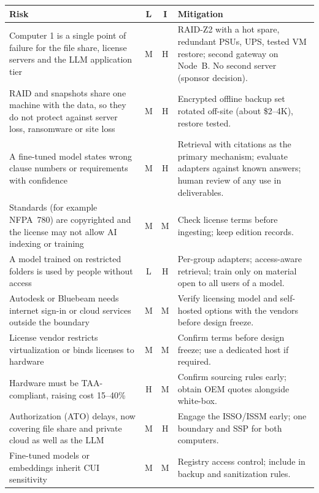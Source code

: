 
{\footnotesize
\begin{xltabular}{\textwidth}{@{}Y{0.839} c c Y{1.161}@{}}
  \toprule
  Risk & L & I & Mitigation \\
  \midrule
  \endhead
  Computer 1 is a single point of failure for the file share, license servers and the LLM application tier & M & H & RAID-Z2 with a hot spare, redundant PSUs, UPS, tested VM restore; second gateway on Node~B. No second server (sponsor decision). \\
  RAID and snapshots share one machine with the data, so they do not protect against server loss, ransomware or site loss & M & H & Encrypted offline backup set rotated off-site (about \$2--4K), restore tested. \\
  A fine-tuned model states wrong clause numbers or requirements with confidence & M & H & Retrieval with citations as the primary mechanism; evaluate adapters against known answers; human review of any use in deliverables. \\
  Standards (for example NFPA~780) are copyrighted and the license may not allow AI indexing or training & M & M & Check license terms before ingesting; keep edition records. \\
  A model trained on restricted folders is used by people without access & L & H & Per-group adapters; access-aware retrieval; train only on material open to all users of a model. \\
  Autodesk or Bluebeam needs internet sign-in or cloud services outside the boundary & M & M & Verify licensing model and self-hosted options with the vendors before design freeze. \\
  License vendor restricts virtualization or binds licenses to hardware & M & M & Confirm terms before design freeze; use a dedicated host if required. \\
  Hardware must be TAA-compliant, raising cost 15--40\% & H & M & Confirm sourcing rules early; obtain OEM quotes alongside white-box. \\
  Authorization (ATO) delays, now covering file share and private cloud as well as the LLM & M & H & Engage the ISSO/ISSM early; one boundary and SSP for both computers. \\
  Fine-tuned models or embeddings inherit CUI sensitivity & M & M & Registry access control; include in backup and sanitization rules. \\

\end{xltabular}}
